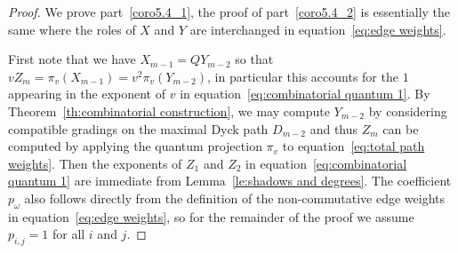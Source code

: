 \documentclass[ALCO,ThmDefs,Unicode,epreuves]{cedram}
\begin{document}
\begin{proof}
 We prove part~\ref{coro5.4_1}, the proof of part~\ref{coro5.4_2} is essentially the same where the roles of $X$ and $Y$ are interchanged in equation~\eqref{eq:edge weights}.

 First note that we have $X_{m-1}=QY_{m-2}$ so that $vZ_m=\pi_v(X_{m-1})=v^2\pi_v(Y_{m-2})$, in particular this accounts for the $1$ appearing in the exponent of $v$ in equation~\eqref{eq:combinatorial quantum 1}.
 By Theorem~\ref{th:combinatorial construction}, we may compute $Y_{m-2}$ by considering compatible gradings on the maximal Dyck path $D_{m-2}$ and thus $Z_m$ can be computed by applying the quantum projection $\pi_v$ to equation~\eqref{eq:total path weights}.
 Then the exponents of $Z_1$ and $Z_2$ in equation~\eqref{eq:combinatorial quantum 1} are immediate from Lemma~\ref{le:shadows and degrees}.
 The coefficient $p_\omega$ also follows directly from the definition of the non-commutative edge weights in equation~\eqref{eq:edge weights}, so for the remainder of the proof we assume $p_{i,j}=1$ for all $i$ and $j$.


\end{proof}
\end{document}
